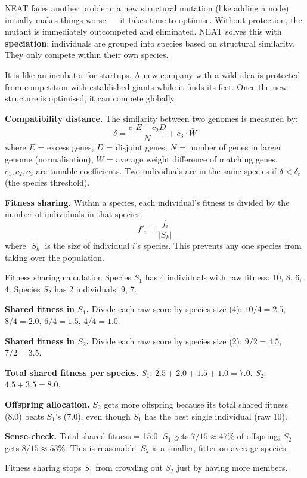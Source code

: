 \documentclass[a4paper,11pt]{article}
\begin{document}
NEAT faces another problem: a new structural mutation (like adding a node) initially makes things worse — it takes time to optimise. Without protection, the mutant is immediately outcompeted and eliminated. NEAT solves this with \textbf{speciation}: individuals are grouped into species based on structural similarity. They only compete within their own species.

\begin{intuition}
It is like an incubator for startups. A new company with a wild idea is protected from competition with established giants while it finds its feet. Once the new structure is optimised, it can compete globally.
\end{intuition}

\textbf{Compatibility distance.} The similarity between two genomes is measured by:
\[
\delta = \frac{c_1 E + c_2 D}{N} + c_3 \cdot \bar{W}
\]
where $E$ = excess genes, $D$ = disjoint genes, $N$ = number of genes in larger genome (normalisation), $\bar{W}$ = average weight difference of matching genes. $c_1, c_2, c_3$ are tunable coefficients. Two individuals are in the same species if $\delta < \delta_t$ (the species threshold).

\textbf{Fitness sharing.} Within a species, each individual's fitness is divided by the number of individuals in that species:
\[
f'_i = \frac{f_i}{|S_k|}
\]
where $|S_k|$ is the size of individual $i$'s species. This prevents any one species from taking over the population.

\begin{worked}{Fitness sharing calculation}
Species $S_1$ has 4 individuals with raw fitness: 10, 8, 6, 4.
Species $S_2$ has 2 individuals: 9, 7.
\begin{steps}
  \item \textbf{Shared fitness in $S_1$.}
        Divide each raw score by species size (4):
        $10/4=2.5$, $8/4=2.0$, $6/4=1.5$, $4/4=1.0$.
  \item \textbf{Shared fitness in $S_2$.}
        Divide each raw score by species size (2):
        $9/2=4.5$, $7/2=3.5$.
  \item \textbf{Total shared fitness per species.}
        $S_1$: $2.5+2.0+1.5+1.0 = 7.0$.
        $S_2$: $4.5+3.5 = 8.0$.
  \item \textbf{Offspring allocation.}
        $S_2$ gets more offspring because its total shared fitness (8.0) beats
        $S_1$'s (7.0), even though $S_1$ has the best single individual (raw 10).
  \item \textbf{Sense-check.} Total shared fitness = 15.0.
        $S_1$ gets $7/15 \approx 47\%$ of offspring; $S_2$ gets $8/15 \approx 53\%$.
        This is reasonable: $S_2$ is a smaller, fitter-on-average species.
\end{steps}
Fitness sharing stops $S_1$ from crowding out $S_2$ just by having more members.
\end{worked}
\end{document}
